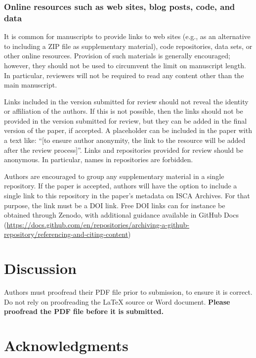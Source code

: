 \documentclass[cameraready]{Interspeech}
\begin{document}
\subsubsection{Online resources such as web sites, blog posts, code, and data}
\label{section:repos}

It is common for manuscripts to provide links to web sites (e.g., as an alternative to including a ZIP file as supplementary material), code repositories, data sets, or other online resources. Provision of such materials is generally encouraged; however, they should not be used to circumvent the limit on manuscript length. In particular, reviewers will not be required to read any content other than the main manuscript.

Links included in the version submitted for review should not reveal the identity or affiliation of the authors. If this is not possible, then the links should not be provided in the version submitted for review, but they can be added in the final version of the paper, if accepted. A placeholder can be included in the paper with a text like: ``[to ensure author anonymity, the link to the resource will be added after the review process]''. Links and repositories provided for review should be anonymous. In particular, names in repositories are forbidden.

Authors are encouraged to group any supplementary material in a single repository. If the paper is accepted, authors will have the option to include a single link to this repository in the paper's metadata on ISCA Archives. For that purpose, the link must be a DOI link. Free DOI links can for instance be obtained through Zenodo, with additional guidance available in GitHub Docs (\url{https://docs.github.com/en/repositories/archiving-a-github-repository/referencing-and-citing-content})

\section{Discussion}

Authors must proofread their PDF file prior to submission, to ensure it is correct. Do not rely on proofreading the \LaTeX\xspace source or Word document. \textbf{Please proofread the PDF file before it is submitted.}

\section{Acknowledgments}
\end{document}
